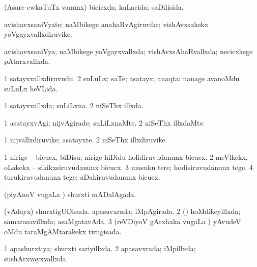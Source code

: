 {{\bentry
{} 
\gl{\gu}
\expl{}
\bmng
(Asare cwkaTuTx \mo vanunx) bicicxda; kaLacida; saDilisida. 
\emng
\eentry

\bentry
{} 
\gl{\nA}
\expl{}
\bmng
avishavxsaniVyate; naMbikege anahaRvAgiruvike; vishAvxsakekx yoVgayxvallxdiruvike. 
\emng
\eentry

\bentry
{} 
\gl{\gu}
\expl{}
\bmng
avishavxsaniVya; naMbikege yoVgayxvallxda; vishAvxsAhaRvallxda; necicxkege pAtarxvallxda. 
\emng
\eentry

\bentry
{} 
\gl{\nA}
\bmng
\bnum
\num{1} satayxvallxdiruvudu. 
\num{2} suLuLx; saTe; asatayx; anaqta:  nanage avanoMdu suLuLx heVLida. 
\enum
\emng
\eentry

\bentry
{} 
\gl{\gu}
\expl{}
\bmng
\bnum
\num{1} satayxvallxda; suLiLxna. 
\num{2} niSeThx illxda. 
\enum
\emng
\eentry

\bentry
{} 
\gl{\kirxvi}
\expl{}
\bmng
\bnum
\num{1} asatayxvAgi; nijvAgirade; suLiLxnaMte. 
\num{2} niSeThx illxdaMte. 
\enum
\emng
\eentry

\bentry
{} 
\gl{\nA}
\expl{}
\bmng
\bnum
\num{1} nijvallxdiruvike; asatayxte. 
\num{2} niSeThx illxdiruvike. 
\enum
\emng
\eentry

\bentry
{} 
\gl{\sakirx}
\expl{}
\bmng
\bnum
\num{1} nirige -- bicucx, biDisu; nirige hiDidu holidiruvudanunx bicucx. 
\num{2} meVlkekx, oLakekx -- sikikxsiruvudanunx bicucx. 
\num{3} musuku tere; hodisiruvudanunx tege. 
\num{4} turukiruvudanunx tege; aDakiruvudanunx bicucx. 
\enum
\emng
\eentry

\bentry
{} 
\gl{\gu}
\expl{}
\bmng
(piyAnoV \mo vugaLa \vi) shurxti mADalAgada. 
\emng
\eentry

\bentry
{} 
\gl{\gu}
\expl{}
\bmng
\bnum
{} (vAdayx) 
\banum
{} shurxtigUDisada. 
 apasavxrada; iMpAgirada. 
\eanum
\numie
\num{2} (\rUpa) hoMdikeyillxda; samarasavillxda; asaMgatavAda. 
\num{3} (reVDiyoV gArxhaka \mo vugaLa \vi) yAvudeV oMdu taraMgAMtarakekx tirugisada. 
\enum
\emng
\eentry

\bentry
{} 
\gl{\gu}
\expl{}
\bmng
\bnum
\num{1} apashurxtiya; shurxti sariyillxda. 
\num{2} apasavxrada; iMpillxda; sushArxvayxvallxda. 
\enum
\emng
\eentry

}}
